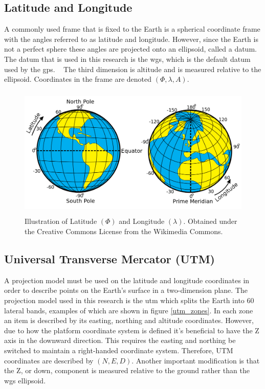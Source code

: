 \subsection{Latitude and Longitude}

A commonly used frame that is fixed to the Earth is a spherical coordinate frame with the angles referred to as latitude and longitude. However, since the Earth is not a perfect sphere these angles are projected onto an ellipsoid, called a datum.  The datum that is used in this research is the \ac{wgs}, which is the default datum used by the \acf{gps}. ~\citep{datums:2016}  The third dimension is altitude and is measured relative to the ellipsoid.  Coordinates in the frame are denoted $(\Phi, \lambda, A)$.

\begin{figure}
	\centering
    \includegraphics[height=2.5in]{figures/latitudelongitude.png}
    \caption[Latitude and longitude]{Illustration of Latitude $(\Phi)$ and Longitude $(\lambda)$. Obtained under the Creative Commons License from the Wikimedia Commons.}
\end{figure}

\subsection{Universal Transverse Mercator (UTM)}
\label{section:utm}

A projection model must be used on the latitude and longitude coordinates in order to describe points on the Earth's surface in a two-dimension plane.  The projection model used in this research is the \acf{utm} which splits the Earth into 60 lateral bands, examples of which are shown in figure \ref{utm_zones}.  In each zone an item is described by its easting, northing and altitude coordinates.  However, due to how the platform coordinate system is defined it's beneficial to have the Z axis in the downward direction.  This requires the easting and northing be switched to maintain a right-handed coordinate system. Therefore, UTM coordinates are described by $(N,E,D)$.  Another important modification is that the Z, or down, component is measured relative to the ground rather than the \ac{wgs} ellipsoid. 


